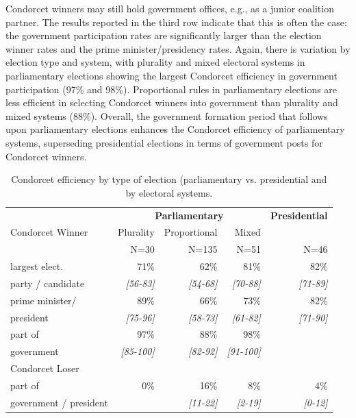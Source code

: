 \documentclass[12pt]{scrartcl}
\begin{document}
Condorcet winners may still hold government offices, e.g., as a junior coalition partner. The results reported in the third row indicate that this is often the case: the government participation rates are significantly larger than the election winner rates and the prime minister/presidency rates. Again, there is variation by election type and system, with plurality and mixed electoral systems in parliamentary elections showing the largest Condorcet efficiency in government participation (97\% and 98\%). Proportional rules in parliamentary elections are less efficient in selecting Condorcet winners into government than plurality and mixed systems (88\%).  Overall, the government formation period that follows upon parliamentary elections enhances the Condorcet efficiency of parliamentary systems, superseding presidential elections in terms of government posts for Condorcet winners.

\begin{table}[ht]
\caption{Condorcet efficiency by type of election (parliamentary vs. presidential and by electoral systems.}
\centering
\begin{tabular}{l|rrr|r} \toprule 
   & \multicolumn{3}{c|}{\textbf{Parliamentary}} & \textbf{Presidential}\\
 Condorcet Winner& Plurality  & Proportional & Mixed &  \\
                &   N=30   & N=135   & N=51    & N=46 \\ \midrule 
largest elect.& 71\%     & 62\%   &   81\% &  82\%  \\
party / candidate & \emph{[56-83]} & \emph{[54-68]} & \emph{[70-88]} & \emph{[71-89]} \\ \midrule 
   prime minister/ &   89\% &  66\% &   73\% &   82\% \\
president & \emph{[75-96]} & \emph{[58-73]} & \emph{[61-82]} & \emph{[71-90]} \\ \midrule
part of &   97\% &  88\% &   98\% &    \\
government & \emph{[85-100]} & \emph{[82-92]} & \emph{[91-100]} & \\ \midrule
Condorcet Loser & & & & \\
part of & 0\%& 16\%& 8\% & 4\%\\
government / president &  & \emph{[11-22]} & \emph{[2-19]} & \emph{[0-12]} \\
\bottomrule 
\end{tabular}
\label{tb.efficiency}
\end{table}
\end{document}
